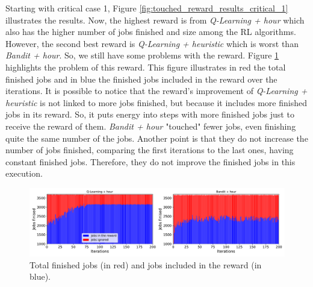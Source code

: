 Starting with critical case 1, Figure \ref{fig:touched_reward_results_critical_1} illustrates the results. Now, the highest reward is from \emph{Q-Learning + hour} which also has the higher number of jobs finished and size among the RL algorithms. However, the second best reward is \emph{Q-Learning + heuristic} which is worst than \emph{Bandit + hour}. So, we still have some problems with the reward. Figure \ref{fig:reward_from_jobs_critical_1} highlights the problem of this reward. This figure illustrates in red the total finished jobs and in blue the finished jobs included in the reward over the iterations. It is possible to notice that the reward's improvement of \emph{Q-Learning + heuristic} is not linked to more jobs finished, but because it includes more finished jobs in its reward. So, it puts energy into steps with more finished jobs just to receive the reward of them. \emph{Bandit + hour} "touched" fewer jobs, even finishing quite the same number of the jobs. Another point is that they do not increase the number of jobs finished, comparing the first iterations to the last ones, having constant finished jobs. Therefore, they do not improve the finished jobs in this execution.

\begin{figure}[!htb]
    \centering
    \includegraphics[scale=0.38]{Images/Learning_compensations/ignored_jobs_touched_scenario_1.pdf}
    \caption{Total finished jobs (in red) and jobs included in the reward (in blue).}
    \label{fig:reward_from_jobs_critical_1}
\end{figure}

